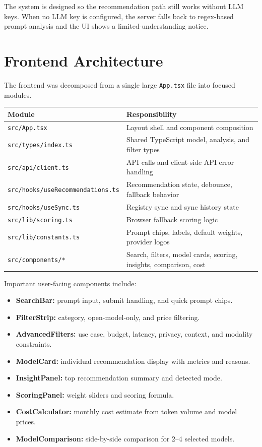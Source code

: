\documentclass[11pt]{article}
\begin{document}
The system is designed so the recommendation path still works without LLM keys. When no LLM key is configured, the server falls back to regex-based prompt analysis and the UI shows a limited-understanding notice.

\section{Frontend Architecture}

The frontend was decomposed from a single large \texttt{App.tsx} file into focused modules.

\begin{table}[h]
\centering
\begin{tabular}{ll}
\toprule
\textbf{Module} & \textbf{Responsibility} \\
\midrule
\texttt{src/App.tsx} & Layout shell and component composition \\
\texttt{src/types/index.ts} & Shared TypeScript model, analysis, and filter types \\
\texttt{src/api/client.ts} & API calls and client-side API error handling \\
\texttt{src/hooks/useRecommendations.ts} & Recommendation state, debounce, fallback behavior \\
\texttt{src/hooks/useSync.ts} & Registry sync and sync history state \\
\texttt{src/lib/scoring.ts} & Browser fallback scoring logic \\
\texttt{src/lib/constants.ts} & Prompt chips, labels, default weights, provider logos \\
\texttt{src/components/*} & Search, filters, model cards, scoring, insights, comparison, cost \\
\bottomrule
\end{tabular}
\end{table}

Important user-facing components include:

\begin{itemize}[leftmargin=*]
  \item \textbf{SearchBar:} prompt input, submit handling, and quick prompt chips.
  \item \textbf{FilterStrip:} category, open-model-only, and price filtering.
  \item \textbf{AdvancedFilters:} use case, budget, latency, privacy, context, and modality constraints.
  \item \textbf{ModelCard:} individual recommendation display with metrics and reasons.
  \item \textbf{InsightPanel:} top recommendation summary and detected mode.
  \item \textbf{ScoringPanel:} weight sliders and scoring formula.
  \item \textbf{CostCalculator:} monthly cost estimate from token volume and model prices.
  \item \textbf{ModelComparison:} side-by-side comparison for 2--4 selected models.
\end{itemize}
\end{document}
